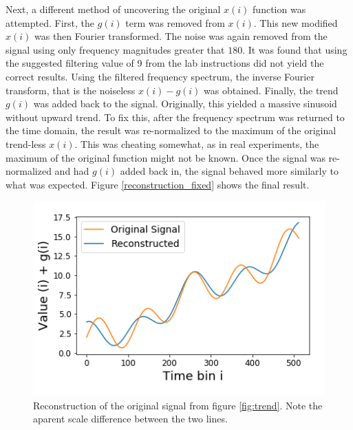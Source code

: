 \documentclass[twocolumn]{article}
\begin{document}
Next, a different method of uncovering the original $x(i)$ function was attempted. First, the $g(i)$ term was removed from $x(i)$. This new modified $x(i)$ was then Fourier transformed. The noise was again removed from the signal using only frequency magnitudes greater that $180$. It was found that using the suggested filtering value of 9 from the lab instructions did not yield the correct results. Using the filtered frequency spectrum, the inverse Fourier transform, that is the noiseless $x(i) - g(i)$ was obtained. Finally, the trend $g(i)$ was added back to the signal. Originally, this yielded a massive sinusoid without upward trend. To fix this, after the frequency spectrum was returned to the time domain, the result was re-normalized to the maximum of the original trend-less $x(i)$. This was cheating somewhat, as in real experiments, the maximum of the original function might not be known. Once the signal was re-normalized and had $g(i)$ added back in, the signal behaved more similarly to what was expected. Figure \ref{reconstruction_fixed} shows the final result.

\begin{figure}
\centering
\includegraphics[width=\linewidth]{reconstruction_fixed}
\caption{Reconstruction of the original signal from figure \ref{fig:trend}. Note the aparent scale difference between the two lines.}
\label{fig:reconstruction_fixed}
\end{figure}
\end{document}
